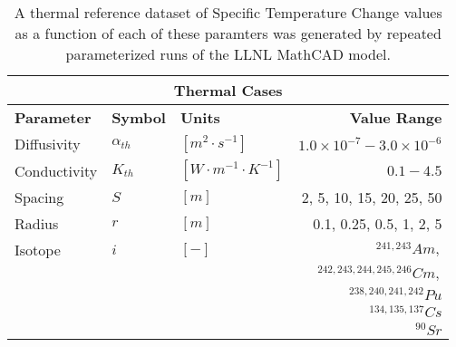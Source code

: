 \begin{table}[ht!]
\centering
\footnotesize{
\begin{tabular}{|l|l|l|r|}
\multicolumn{4}{c}{\textbf{Thermal Cases}}\\
\hline
\textbf{Parameter} & \textbf{Symbol} & \textbf{Units} & \textbf{Value Range} \\
\hline
Diffusivity & $\alpha_{th}$ & $[m^2\cdot s^{-1}]$ & $1.0\times10^{-7}-3.0\times10^{-6}$\\
\hline
Conductivity & $K_{th}$     & $[W\cdot m^{-1} \cdot K^{-1}]$ & $0.1 - 4.5$ \\
\hline
Spacing & $S$ & $[m]$ & 2, 5, 10, 15, 20, 25, 50 \\
\hline
Radius & $r$ & $[m]$ & 0.1, 0.25, 0.5, 1, 2, 5 \\
\hline
Isotope & $i$ & $[-]$ & $^{241,243}Am,$  \\
        & & & $^{242,243,244,245,246}Cm,$  \\
        & & & $^{238,240,241,242}Pu$  \\
        & & & $^{134,135,137}Cs$  \\
        & & & $^{90}Sr$  \\
\hline
\end{tabular}
\caption{A thermal reference dataset of Specific Temperature Change values as a function of each of these paramters was generated by repeated parameterized runs of the LLNL 
MathCAD model\cite{greenberg_application_2012, sutton_investigations_2011}.}
\label{tab:therm_cases}
}
\end{table}

